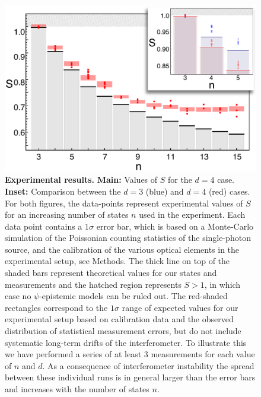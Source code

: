 \documentclass[aps,prl,floatfix,twocolumn,tightenlines,amsmath,amssymb,nofootinbib]{revtex4-1}
\begin{document}
\begin{figure}[h!]
\begin{center}
\includegraphics[width=\columnwidth]{Figure_3.pdf}
\end{center}
\vspace{-1.5em}
\caption{\textbf{Experimental results.} \textbf{Main:} Values of $S$ for the $d{=}4$ case. \textbf{Inset:} Comparison between the $d{=}3$ (blue) and $d{=}4$ (red) cases. For both figures, the data-points represent experimental values of $S$ for an increasing number of states $n$ used in the experiment. Each data point contains a $1\sigma$ error bar, which is based on a Monte-Carlo simulation of the Poissonian counting statistics of the single-photon source, and the calibration of the various optical elements in the experimental setup, see Methods. The thick line on top of the shaded bars represent theoretical values for our states and measurements and the hatched region represents $S>1$, in which case no $\psi$-epistemic models can be ruled out. The red-shaded rectangles correspond to the $1\sigma$ range of expected values for our experimental setup based on calibration data and the observed distribution of statistical measurement errors, but do not include systematic long-term drifts of the interferometer. To illustrate this we have performed a series of at least 3 measurements for each value of $n$ and $d$. As a consequence of interferometer instability the spread between these individual runs is in general larger than the error bars and increases with the number of states $n$.}
\vspace{-1em}
  \label{fig:results}
\end{figure}
\end{document}
